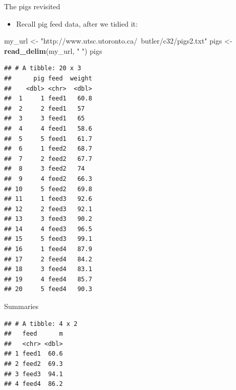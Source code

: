 \documentclass[ignorenonframetext,]{beamer}
\newenvironment{Shaded}{\begin{snugshade}}{\end{snugshade}}
\newcommand{\DataTypeTok}[1]{\textcolor[rgb]{0.13,0.29,0.53}{#1}}
\newcommand{\KeywordTok}[1]{\textcolor[rgb]{0.13,0.29,0.53}{\textbf{#1}}}
\newcommand{\NormalTok}[1]{#1}
\newcommand{\OperatorTok}[1]{\textcolor[rgb]{0.81,0.36,0.00}{\textbf{#1}}}
\newcommand{\StringTok}[1]{\textcolor[rgb]{0.31,0.60,0.02}{#1}}
\providecommand{\tightlist}{%
  \setlength{\itemsep}{0pt}\setlength{\parskip}{0pt}}
\begin{document}
\begin{frame}[fragile]{The pigs revisited}
\protect\hypertarget{the-pigs-revisited}{}

\begin{itemize}
\tightlist
\item
  Recall pig feed data, after we tidied it:
\end{itemize}

\begin{Shaded}
\begin{Highlighting}[]
\NormalTok{my_url <-}\StringTok{ "http://www.utsc.utoronto.ca/~butler/c32/pigs2.txt"}
\NormalTok{pigs <-}\StringTok{ }\KeywordTok{read_delim}\NormalTok{(my_url, }\StringTok{" "}\NormalTok{)}
\NormalTok{pigs }
\end{Highlighting}
\end{Shaded}

\begin{verbatim}
## # A tibble: 20 x 3
##      pig feed  weight
##    <dbl> <chr>  <dbl>
##  1     1 feed1   60.8
##  2     2 feed1   57  
##  3     3 feed1   65  
##  4     4 feed1   58.6
##  5     5 feed1   61.7
##  6     1 feed2   68.7
##  7     2 feed2   67.7
##  8     3 feed2   74  
##  9     4 feed2   66.3
## 10     5 feed2   69.8
## 11     1 feed3   92.6
## 12     2 feed3   92.1
## 13     3 feed3   90.2
## 14     4 feed3   96.5
## 15     5 feed3   99.1
## 16     1 feed4   87.9
## 17     2 feed4   84.2
## 18     3 feed4   83.1
## 19     4 feed4   85.7
## 20     5 feed4   90.3
\end{verbatim}

\end{frame}

\begin{frame}[fragile]{Summaries}
\protect\hypertarget{summaries}{}

\begin{Shaded}
\end{Shaded}

\begin{verbatim}
## # A tibble: 4 x 2
##   feed      m
##   <chr> <dbl>
## 1 feed1  60.6
## 2 feed2  69.3
## 3 feed3  94.1
## 4 feed4  86.2
\end{verbatim}

\end{frame}
\end{document}
